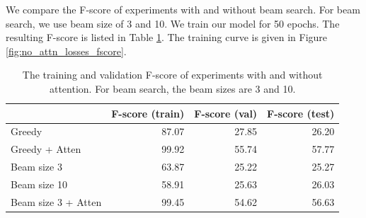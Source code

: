 \documentclass[11pt,a4paper]{article}
\begin{document}
    We compare the F-score of experiments with and without beam search. For beam search, we use beam size of 3 and 10. We train our model for 50 epochs. The resulting F-score is listed in Table \ref{tab:atten}. The training curve is given in Figure \ref{fig:no_attn_losses_fscore}.




\begin{table}[ht]
\centering
\caption{The training and validation F-score of experiments with and without attention. For beam search, the beam sizes are 3 and 10.}
\label{tab:atten}
\begin{tabular}{lrrr}
\toprule
                  & F-score (train) & F-score (val)  & F-score (test)   \\ \midrule
Greedy          & 87.07            & 27.85     & 26.20              \\
Greedy + Atten  & 99.92            & 55.74     & 57.77              \\
Beam size 3          & 63.87            & 25.22    & 25.27               \\
Beam size 10          & 58.91            & 25.63  & 26.03               \\
Beam size 3 + Atten  & 99.45              & 54.62   & 56.63      \\ \bottomrule
\end{tabular}
\end{table}





\end{document}
